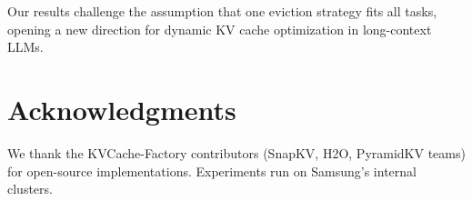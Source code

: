 \documentclass[11pt]{article}
\begin{document}
Our results challenge the assumption that one eviction strategy fits all tasks, opening a new direction for dynamic KV cache optimization in long-context LLMs.

\section*{Acknowledgments}

We thank the KVCache-Factory contributors (SnapKV, H2O, PyramidKV teams) for open-source implementations. Experiments run on Samsung's internal clusters.



\end{document}
